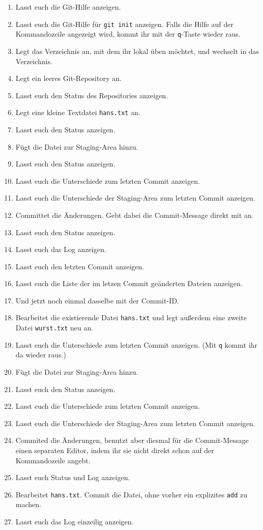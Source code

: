 \documentclass[a4paper,12pt]{scrartcl}
\begin{document}
\begin{enumerate}
  \item Lasst euch die Git-Hilfe anzeigen.
  \item Lasst euch die Git-Hilfe für \texttt{git init} anzeigen. Falls die Hilfe auf der Kommandozeile angezeigt wird, kommt ihr mit der \texttt{q}-Taste wieder raus.
  \item Legt das Verzeichnis an, mit dem ihr lokal üben möchtet, und wechselt in das Verzeichnis.
  \item Legt ein leeres Git-Repository an.
  \item Lasst euch den Status des Repositories anzeigen.
  \item Legt eine kleine Textdatei \texttt{hans.txt} an.
  \item Lasst euch den Status anzeigen.
  \item Fügt die Datei zur Staging-Area hinzu.
  \item Lasst euch den Status anzeigen.
  \item Lasst euch die Unterschiede zum letzten Commit anzeigen.
  \item Lasst euch die Unterschiede der Staging-Area zum letzten Commit anzeigen.
  \item Committet die Änderungen. Gebt dabei die Commit-Message direkt mit an.
  \item Lasst euch den Status anzeigen.
  \item Lasst euch das Log anzeigen.
  \item Lasst euch den letzten Commit anzeigen.
  \item Lasst euch die Liste der im letzen Commit geänderten Dateien anzeigen.
  \item Und jetzt noch einmal dasselbe mit der Commit-ID.
  \item Bearbeitet die existierende Datei \texttt{hans.txt} und legt außerdem eine zweite Datei \texttt{wurst.txt} neu an.
  \item Lasst euch die Unterschiede zum letzten Commit anzeigen. (Mit \texttt{q} kommt ihr da wieder raus.)
  \item Fügt die Datei zur Staging-Area hinzu.
  \item Lasst euch den Status anzeigen.
  \item Lasst euch die Unterschiede zum letzten Commit anzeigen.
  \item Lasst euch die Unterschiede der Staging-Area zum letzten Commit anzeigen.
  \item Commited die Änderungen, benutzt aber diesmal für die Commit-Message einen separaten Editor, indem ihr sie nicht direkt schon auf der Kommandozeile angebt.
  \item Lasst euch Status und Log anzeigen.
  \item Bearbeitet \texttt{hans.txt}. Commit die Datei, ohne vorher ein explizites \texttt{add} zu machen.
  \item Lasst euch das Log einzeilig anzeigen.
\end{enumerate}
\end{document}
